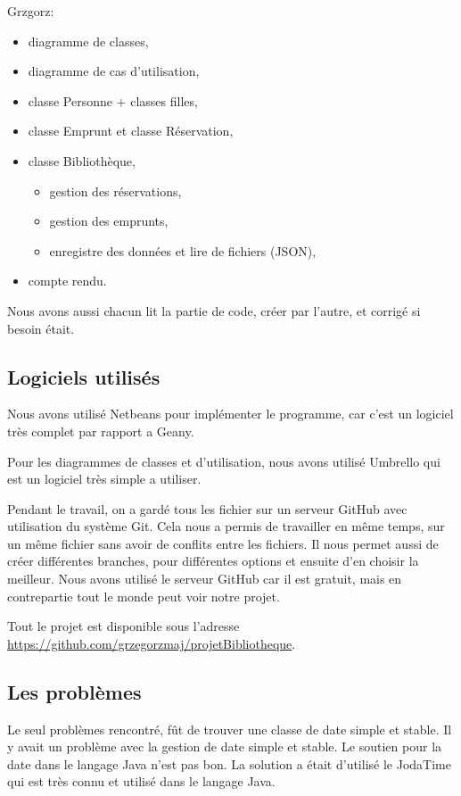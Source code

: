 \documentclass[10pt, a4paper]{article}
\begin{document}
		
		Grzgorz:
		\begin{itemize}
			\item diagramme de classes,
			\item diagramme de cas d'utilisation,			
			\item classe Personne + classes filles,
			\item classe Emprunt et classe Réservation,
			\item classe Bibliothèque,
			\begin{itemize}
				\item gestion des réservations,
				\item gestion des emprunts,
				\item enregistre des données et lire de fichiers (JSON),
			\end{itemize}
			\item compte rendu.
		\end{itemize}
		
		Nous avons aussi chacun lit la partie de code, créer par l'autre, et corrigé si besoin était.
		
		\subsection{Logiciels utilisés}
		Nous avons utilisé Netbeans pour implémenter le programme, car c'est un logiciel très complet par 
		rapport a Geany.

		Pour les diagrammes de classes et d'utilisation, nous avons utilisé Umbrello qui est un logiciel 	
		très simple a utiliser.
		
		Pendant le travail, on a gardé tous les fichier sur un serveur GitHub avec utilisation du système 
		Git. Cela nous a permis de travailler en même temps, sur un même fichier sans avoir de conflits entre 
		les fichiers. Il nous permet aussi de créer différentes branches, pour différentes options et 
		ensuite d'en choisir la meilleur. Nous avons utilisé le serveur GitHub car il est gratuit, mais en 
		contrepartie tout le monde peut voir notre projet.
		
		Tout le projet est disponible sous l'adresse
		\url{https://github.com/grzegorzmaj/projetBibliotheque}.
		
		\subsection{Les problèmes}
		
		Le seul problèmes rencontré, fût de trouver une classe de date simple et stable. Il y avait un problème avec la gestion de 
		date simple et stable. Le soutien pour la date dans le langage Java n'est pas bon. La solution a était d'utilisé le JodaTime 
		qui est très connu et utilisé dans le langage Java.
		
	
\end{document}
